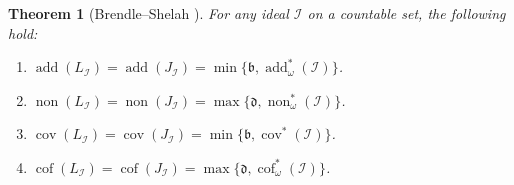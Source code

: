 \documentclass[a4paper,12pt]{amsart}
\newtheorem{thm}{Theorem}
\theoremstyle{definition}
\numberwithin{thm}{section}
\numberwithin{equation}{section}
\DeclareMathOperator{\non}{non}
\DeclareMathOperator{\cov}{cov}
\DeclareMathOperator{\add}{add}
\DeclareMathOperator{\cof}{cof}
\newcommand{\I}{\mathscr{I}}
\begin{document}
    \begin{thm}[Brendle--Shelah {\cite[Theorem 2]{BS99}}]
        \label{thm:Louveau_null}
        For any ideal $\mathscr{I}$ on a countable set, the following hold:
        \begin{enumerate}
            \item $\add(L_\I) = \add(J_\I) =  \min\{\mathfrak{b}, \add^*_\omega(\mathscr{I})\}$.
            \item $\non(L_\I) = \non(J_\I) = \max\{\mathfrak{d}, \non^*_\omega(\mathscr{I})\}$.
            \item $\cov(L_\I) = \cov(J_\I) = \min\{\mathfrak{b}, \cov^*(\mathscr{I})\}$.
            \item $\cof(L_\I) = \cof(J_\I) = \max\{\mathfrak{d}, \cof^*_\omega(\mathscr{I})\}$.
        \end{enumerate}
    \end{thm}
\end{document}
